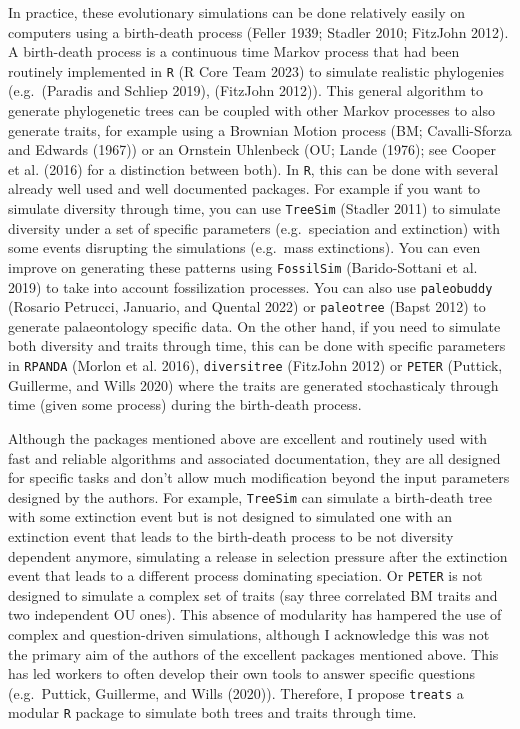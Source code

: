 \documentclass[
]{article}
\begin{document}
In practice, these evolutionary simulations can be done relatively
easily on computers using a birth-death process (Feller 1939; Stadler
2010; FitzJohn 2012). A birth-death process is a continuous time Markov
process that had been routinely implemented in \texttt{R} (R Core Team
2023) to simulate realistic phylogenies (e.g.~(Paradis and Schliep
2019), (FitzJohn 2012)). This general algorithm to generate phylogenetic
trees can be coupled with other Markov processes to also generate
traits, for example using a Brownian Motion process (BM; Cavalli-Sforza
and Edwards (1967)) or an Ornstein Uhlenbeck (OU; Lande (1976); see
Cooper et al. (2016) for a distinction between both). In \texttt{R},
this can be done with several already well used and well documented
packages. For example if you want to simulate diversity through time,
you can use \texttt{TreeSim} (Stadler 2011) to simulate diversity under
a set of specific parameters (e.g.~speciation and extinction) with some
events disrupting the simulations (e.g.~mass extinctions). You can even
improve on generating these patterns using \texttt{FossilSim}
(Barido-Sottani et al. 2019) to take into account fossilization
processes. You can also use \texttt{paleobuddy} (Rosario Petrucci,
Januario, and Quental 2022) or \texttt{paleotree} (Bapst 2012) to
generate palaeontology specific data. On the other hand, if you need to
simulate both diversity and traits through time, this can be done with
specific parameters in \texttt{RPANDA} (Morlon et al. 2016),
\texttt{diversitree} (FitzJohn 2012) or \texttt{PETER} (Puttick,
Guillerme, and Wills 2020) where the traits are generated stochasticaly
through time (given some process) during the birth-death process.

Although the packages mentioned above are excellent and routinely used
with fast and reliable algorithms and associated documentation, they are
all designed for specific tasks and don't allow much modification beyond
the input parameters designed by the authors. For example,
\texttt{TreeSim} can simulate a birth-death tree with some extinction
event but is not designed to simulated one with an extinction event that
leads to the birth-death process to be not diversity dependent anymore,
simulating a release in selection pressure after the extinction event
that leads to a different process dominating speciation. Or
\texttt{PETER} is not designed to simulate a complex set of traits (say
three correlated BM traits and two independent OU ones). This absence of
modularity has hampered the use of complex and question-driven
simulations, although I acknowledge this was not the primary aim of the
authors of the excellent packages mentioned above. This has led workers
to often develop their own tools to answer specific questions
(e.g.~Puttick, Guillerme, and Wills (2020)). Therefore, I propose
\texttt{treats} a modular \texttt{R} package to simulate both trees and
traits through time.
\end{document}
